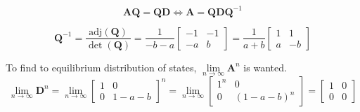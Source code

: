 \documentclass[a4paper]{article}
\newcommand{\vv}{\mathbf}
\newcommand{\adj}{\mathrm{adj}}
\begin{document}
\[\vv A\vv Q=\vv Q\vv D\iff\vv A=\vv Q\vv D\vv Q^{-1}\]

\[\vv Q^{-1}=\frac{\adj(\vv Q)}{\det(\vv Q)}=\frac1{-b-a}\begin{bmatrix}-1&-1\\-a&b\end{bmatrix}=\frac1{a+b}\begin{bmatrix}1&1\\a&-b\end{bmatrix}\]

To find to equilibrium distribution of states, \(\lim\limits_{n\to\infty}\vv A^n\) is wanted.
\[\lim\limits_{n\to\infty}\vv D^n
	=\lim\limits_{n\to\infty}\begin{bmatrix}1&0\\0&1-a-b\end{bmatrix}^n
	=\lim\limits_{n\to\infty}\begin{bmatrix}1^n&0\\0&(1-a-b)^n\end{bmatrix}
	=\begin{bmatrix}1&0\\0&0\end{bmatrix}\]
\end{document}

